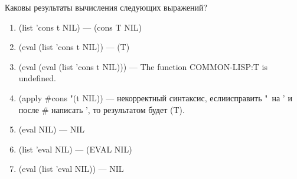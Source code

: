 Каковы результаты вычисления следующих выражений?
\begin{enumerate}
    \item (list 'cons t NIL) --- (cons T NIL)
    \item (eval (list 'cons t NIL)) --- (T)
    \item (eval (eval (list 'cons t NIL))) --- The function COMMON-LISP:T is undefined.
    \item (apply \#cons "(t NIL)) --- некорректный синтаксис, если\newline исправить "\ на ' и после \# написать ', то результатом будет (T).
    \item (eval NIL) --- NIL
    \item (list 'eval NIL) --- (EVAL NIL)
    \item (eval (list 'eval NIL)) --- NIL
\end{enumerate}
